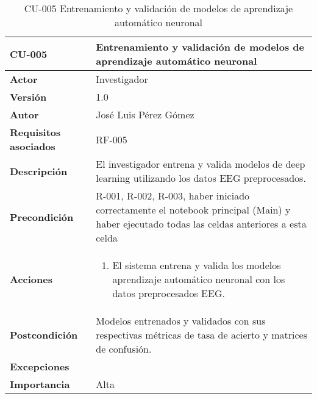 \begin{table}[p]
	\centering
	\begin{tabularx}{\linewidth}{ p{} p{} }
		\toprule
		\textbf{CU-005}    & \textbf{Entrenamiento y validación de modelos de aprendizaje automático neuronal}\\
		\toprule
		\textbf{Actor}              & Investigador    \\ 
		\textbf{Versión}              & 1.0    \\
		\textbf{Autor}                & José Luis Pérez Gómez \\
		\textbf{Requisitos asociados} & RF-005 \\
		\textbf{Descripción}          & El investigador entrena y valida modelos de deep learning utilizando los datos EEG preprocesados.\\
		\textbf{Precondición}         & R-001, R-002, R-003, haber iniciado correctamente el notebook principal (Main) y haber ejecutado todas las celdas anteriores a esta celda\\
		\textbf{Acciones}             &
		\begin{enumerate}
			\def\labelenumi{\arabic{enumi}.}
			\tightlist
			\item El sistema entrena y valida los modelos aprendizaje automático neuronal con los datos preprocesados EEG.
		\end{enumerate}\\
		\textbf{Postcondición}        & Modelos entrenados y validados con sus respectivas métricas de tasa de acierto y matrices de confusión.\\
		\textbf{Excepciones}          &  \\
		\textbf{Importancia}          & Alta \\
		\bottomrule
	\end{tabularx}
	\caption{CU-005 Entrenamiento y validación de modelos de aprendizaje automático neuronal}
\end{table}



